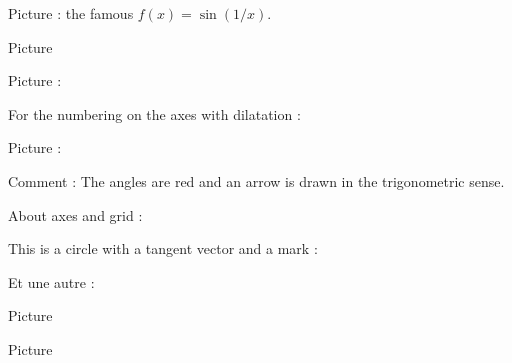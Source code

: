 
Picture  : the famous \( f(x)=\sin(1/x)\).
\begin{center}
   
\end{center}
   

Picture 
\begin{center}
   
\end{center}
   

Picture : 
\begin{center}
   
\end{center}
   

For the numbering on the axes with dilatation : 
\begin{center}
   
\end{center}



Picture : 
\begin{center}
   
\end{center}
Comment : The angles are red and an arrow is drawn in the trigonometric sense.



About axes and grid : 
\begin{center}
   
\end{center}
   


This is a circle with a tangent vector and a mark :

\begin{center}
    
\end{center}


Et une autre : 

\begin{center}
   
\end{center}


Picture 
\begin{center}
   
\end{center}
   

Picture 
\begin{center}
   
\end{center}


